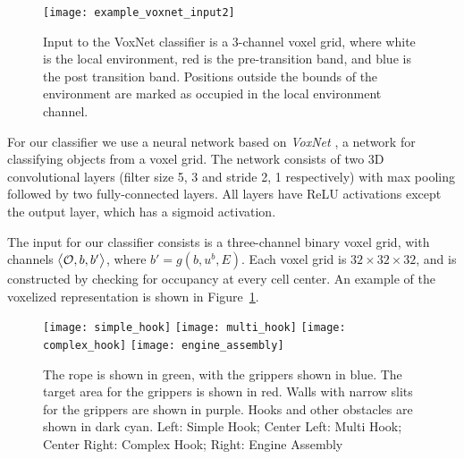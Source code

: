 \begin{figure}[t]
    \vspace{0.02in}
    \centering
    \texttt{[image: example\_voxnet\_input2]}
    \caption{Input to the VoxNet classifier is a 3-channel voxel grid, where white is the local environment, red is the pre-transition band, and blue is the post transition band. Positions outside the bounds of the environment are marked as occupied in the local environment channel.}
    \vspace{-0.1in}
    \label{fig:VoxNet_input}
\end{figure}



For our classifier we use a neural network based on \textit{VoxNet} \cite{Maturana2015VoxNet}, a network for classifying objects from a voxel grid. The network consists of two 3D convolutional layers (filter size 5, 3 and stride 2, 1 respectively) with max pooling followed by two fully-connected layers. All layers have ReLU activations except the output layer, which has a sigmoid activation.

The input for our classifier consists is a three-channel binary voxel grid, with channels  $\big<\mathcal{O}, b, b'\big>$, where $b' = g(b, u^b, E)$. Each voxel grid is $32\times32\times32$, and is constructed by checking for occupancy at every cell center. An example of the voxelized representation is shown in Figure~\ref{fig:VoxNet_input}.



\begin{figure*}[t]
    \vspace{0.02in}
    \centering
    \texttt{[image: simple\_hook]}\hfill
    \texttt{[image: multi\_hook]}\hfill
    \texttt{[image: complex\_hook]}\hfill
    \texttt{[image: engine\_assembly]}%
    \vspace{-0.1in}
    \caption{The rope is shown in green, with the grippers shown in blue. The target area for the grippers is shown in red. Walls with narrow slits for the grippers are shown in purple. Hooks and other obstacles are shown in dark cyan. Left: Simple Hook; Center Left: Multi Hook; Center Right: Complex Hook; Right: Engine Assembly}
    \label{fig:scenarios}
    \vspace{-0.25in}
\end{figure*}

